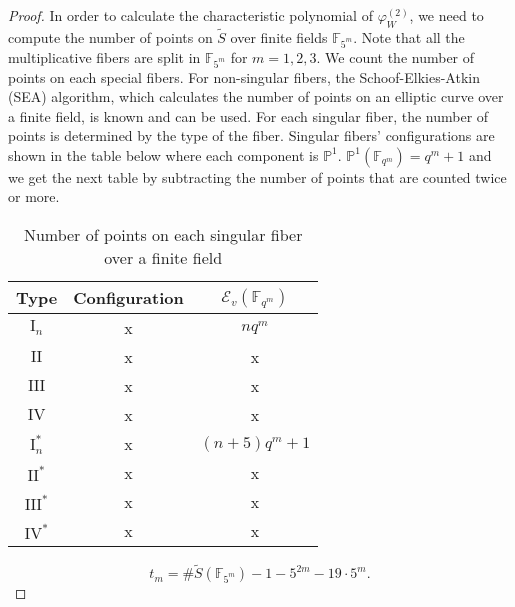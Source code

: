 \documentclass[main]{subfiles}
\begin{document}
\begin{proof}
    In order to calculate the characteristic polynomial of $\varphi^{(2)}_{W}$, we need to compute the number of points on $\tilde{S}$ over finite fields $\mathbb{F}_{5^{m}}$.
    Note that all the multiplicative fibers are split in $\mathbb{F}_{5^{m}}$ for $m=1,2,3$.
    We count the number of points on each special fibers.
    For non-singular fibers, the Schoof-Elkies-Atkin (SEA) algorithm, which calculates the number of points on an elliptic curve over a finite field, is known and can be used.
    For each singular fiber, the number of points is determined by the type of the fiber.
    Singular fibers' configurations are shown in the table below where each component is $\mathbb{P}^{1}$.
    $\mathbb{P}^1(\mathbb{F}_{q^m}) = q^m + 1$ and we get the next table by subtracting the number of points that are counted twice or more.
    \begin{table}[ht]
        \centering
        \caption{Number of points on each singular fiber over a finite field}
        \begin{tabular}{|c|c|c|}
            \hline
            Type             & Configuration & $\mathcal{E}_v(\mathbb{F}_{q^{m}})$ \\
            \hline
            $\mathrm{I}_n$   & x             & $nq^m$                              \\
            $\mathrm{II}$    & x             & x                                   \\
            $\mathrm{III}$   & x             & x                                   \\
            $\mathrm{IV}$    & x             & x                                   \\
            $\mathrm{I}_n^*$ & x             & $(n+5) q^m+1$                         \\
            $\mathrm{II}^*$  & x             & x                                \\
            $\mathrm{III}^*$ & x             & x                                 \\
            $\mathrm{IV}^*$  & x             & x                                 \\
            \hline
        \end{tabular}
    \end{table}
    
    \begin{equation*}
        t_{m} = \# \tilde{S}(\mathbb{F}_{5^{m}}) - 1 - 5^{2m} - 19 \cdot 5^{m}.
    \end{equation*}


\end{proof}
\end{document}
